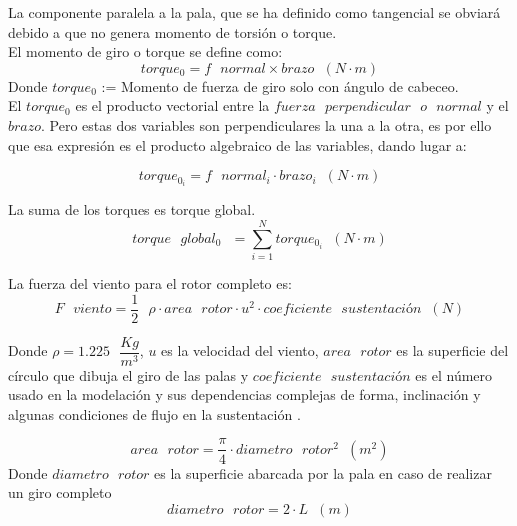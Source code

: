 La componente paralela a la pala, que se ha definido como tangencial se obviará debido a que no genera momento de torsión o torque.\\
  
El momento de giro o torque se define como:
  \begin{equation}
  torque_0 = f \text{ } normal \times brazo \hspace{7pt} (N \cdot m)
  \label{def:torque_inicial}
 \end{equation}
 Donde $torque_0$ := Momento de fuerza de giro solo con ángulo de cabeceo.\\


El $torque_0$ es el producto vectorial entre la $fuerza  \text{ }perpendicular \text{ } o \text{ } normal$ y el $brazo$. Pero estas dos variables son perpendiculares la una a la otra, es por ello que esa expresión es el producto algebraico de las variables, dando lugar a:
 
 
  \begin{equation}
  torque_{0_i} = f \text{ } normal_i \cdot brazo_i \hspace{7pt} (N \cdot m)
 \label{def:torque_algebraico_inicial}
 \end{equation}
 
 La suma de los torques es torque global.
 \begin{equation}
  torque \text{ } global_0 \text{ } = \sum_{i=1}^{N} torque_{0_i} \hspace{7pt} (N \cdot m)
\label{def:torque_global}
\end{equation}
 
 
La fuerza del viento para el rotor completo es:
 \begin{equation}
  F \text{ } viento = \dfrac{1}{2} \text{ } \rho \cdot area \text{ } rotor \cdot u^2 \cdot coeficiente \text{ } sustentación \hspace{7pt} (N)
   \end{equation}
   
    Donde $\rho = 1.225 \text{ } \dfrac{Kg}{m^3}$, $u$ es la velocidad del viento, $area \text{ } rotor$ es la superficie del círculo que dibuja el giro de las palas y $coeficiente \text{ } sustentación$ es el número usado en la modelación y sus dependencias complejas de forma, inclinación y algunas condiciones de flujo en la sustentación \cite{Hall2021}.
    
  \begin{equation}
  area \text{ } rotor = \dfrac{\pi}{4} \cdot diametro \text{ } rotor^2 \hspace{7pt} (m^2) 
  \end{equation}
  Donde $diametro \text{ } rotor $ es la superficie abarcada por la pala en caso de realizar un giro completo
  \begin{equation}
  diametro \text{ } rotor = 2 \cdot L \hspace{7pt} (m)
 \end{equation}

